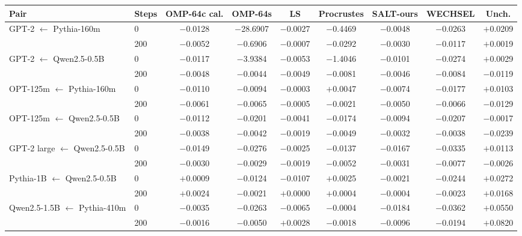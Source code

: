 \begin{tabular}{llccccccc}
\toprule
Pair & Steps & OMP-64c cal. & OMP-64s & LS & Procrustes & SALT-ours & WECHSEL & Unch. \\
\midrule
GPT-2 $\leftarrow$ Pythia-160m & 0 & $-$0.0128 & $-$28.6907 & $-$0.0027 & $-$0.4469 & $-$0.0048 & $-$0.0263 & $+$0.0209 \\
 & 200 & $-$0.0052 & $-$0.6906 & $-$0.0007 & $-$0.0292 & $-$0.0030 & $-$0.0117 & $+$0.0019 \\
\addlinespace
GPT-2 $\leftarrow$ Qwen2.5-0.5B & 0 & $-$0.0117 & $-$3.9384 & $-$0.0053 & $-$1.4046 & $-$0.0101 & $-$0.0274 & $+$0.0029 \\
 & 200 & $-$0.0048 & $-$0.0044 & $-$0.0049 & $-$0.0081 & $-$0.0046 & $-$0.0084 & $-$0.0119 \\
\addlinespace
OPT-125m $\leftarrow$ Pythia-160m & 0 & $-$0.0110 & $-$0.0094 & $-$0.0003 & $+$0.0047 & $-$0.0074 & $-$0.0177 & $+$0.0103 \\
 & 200 & $-$0.0061 & $-$0.0065 & $-$0.0005 & $-$0.0021 & $-$0.0050 & $-$0.0066 & $-$0.0129 \\
\addlinespace
OPT-125m $\leftarrow$ Qwen2.5-0.5B & 0 & $-$0.0112 & $-$0.0201 & $-$0.0041 & $-$0.0174 & $-$0.0094 & $-$0.0207 & $-$0.0017 \\
 & 200 & $-$0.0038 & $-$0.0042 & $-$0.0019 & $-$0.0049 & $-$0.0032 & $-$0.0038 & $-$0.0239 \\
\addlinespace
GPT-2 large $\leftarrow$ Qwen2.5-0.5B & 0 & $-$0.0149 & $-$0.0276 & $-$0.0025 & $-$0.0137 & $-$0.0167 & $-$0.0335 & $+$0.0113 \\
 & 200 & $-$0.0030 & $-$0.0029 & $-$0.0019 & $-$0.0052 & $-$0.0031 & $-$0.0077 & $-$0.0026 \\
\addlinespace
Pythia-1B $\leftarrow$ Qwen2.5-0.5B & 0 & $+$0.0009 & $-$0.0124 & $-$0.0107 & $+$0.0025 & $-$0.0021 & $-$0.0244 & $+$0.0272 \\
 & 200 & $+$0.0024 & $-$0.0021 & $+$0.0000 & $+$0.0004 & $-$0.0004 & $-$0.0023 & $+$0.0168 \\
\addlinespace
Qwen2.5-1.5B $\leftarrow$ Pythia-410m & 0 & $-$0.0035 & $-$0.0263 & $-$0.0065 & $-$0.0004 & $-$0.0184 & $-$0.0362 & $+$0.0550 \\
 & 200 & $-$0.0016 & $-$0.0050 & $+$0.0028 & $-$0.0018 & $-$0.0096 & $-$0.0194 & $+$0.0820 \\
\bottomrule
\end{tabular}
